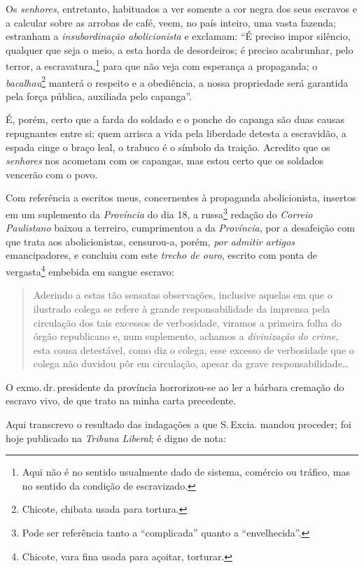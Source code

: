 Os \emph{senhores}, entretanto, habituados a ver somente a cor negra dos
seus escravos e a calcular sobre as arrobas de café, veem, no país
inteiro, uma vasta fazenda; estranham a \emph{insubordinação
abolicionista} e exclamam: ``É preciso impor silêncio, qualquer que seja
o meio, a esta horda de desordeiros; é preciso acabrunhar, pelo terror,
a escravatura,\footnote{Aqui não é no sentido usualmente dado de
  sistema, comércio ou tráfico, mas no sentido da condição de
  escravizado.} para que não veja com esperança a propaganda; o
\emph{bacalhau}\footnote{Chicote, chibata usada para tortura.} manterá
o respeito e a obediência, a nossa propriedade será garantida pela força
pública, auxiliada pelo capanga''.

É, porém, certo que a farda do soldado e o ponche do capanga são duas
causas repugnantes entre si; quem arrisca a vida pela liberdade detesta
a escravidão, a espada cinge o braço leal, o trabuco é o símbolo da
traição. Acredito que os \emph{senhores} nos acometam com os capangas,
mas estou certo que os soldados vencerão com o povo.

Com referência a escritos meus, concernentes à propaganda abolicionista,
insertos em um suplemento da \emph{Província} do dia 18, a
russa\footnote{Pode ser referência tanto a ``complicada'' quanto a
  ``envelhecida''.} redação do \emph{Correio Paulistano} baixou a terreiro,
cumprimentou a da \emph{Província}, por a desafeição com que trata aos
abolicionistas, censurou-a, porém, \emph{por admitir artigos}
emancipadores, e concluiu com este \emph{trecho de ouro}, escrito com
ponta de vergasta\footnote{Chicote, vara fina usada para açoitar,
  torturar.} embebida em sangue escravo:

\begin{quote}
Aderindo a estas tão sensatas observações, inclusive aquelas em que o
ilustrado colega se refere à grande responsabilidade da imprensa pela
circulação dos tais excessos de verbosidade, viramos a primeira folha do
órgão republicano e, num suplemento, achamos a \emph{divinização do
crime}, esta cousa detestável, como diz o colega, esse excesso de
verbosidade que o colega não duvidou pôr em circulação, apesar da grave
responsabilidade\ldots{}
\end{quote}

O exmo.\,dr.\,presidente da província horrorizou-se ao ler a bárbara
cremação do escravo vivo, de que trato na minha carta precedente.

Aqui transcrevo o resultado das indagações a que S.\,Excia. mandou
proceder; foi hoje publicado na \emph{Tribuna} \emph{Liberal}; é digno
de nota:

